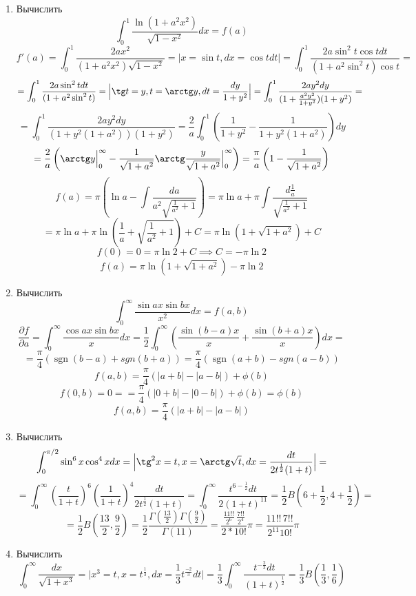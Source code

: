 \documentclass{article}
\DeclareMathOperator{\sgn}{sgn}
\begin{document}
\begin{large}
\begin{enumerate}
\item Вычислить
$$ \int_0^1 \frac{\ln(1+a^2x^2)}{\sqrt{1-x^2}} dx = f(a) $$
$$ f'(a) = \int_0^1 \frac{2ax^2}{(1+a^2x^2)\sqrt{1-x^2}} = \Big| x = \sin t, dx =\cos t dt \Big| = \int_0^1 \frac{2a\sin^2 t \cos t dt}{(1+a^2\sin^2 t)\cos t} = $$
$$ = \int_0^1 \frac{2a \sin^2 t dt}{(1+a^2\sin^2 t)} = \Big| \tg t = y, t = \arctg y, dt = \frac{dy}{1+y^2} \Big| = \int_0^1 \frac{2a y^2 dy}{(1+\frac{a^2y^2}{1+y^2})(1+y^2)} = $$
$$ = \int_0^1 \frac{2a y^2 dy}{(1+y^2(1+a^2))(1+y^2)} = \frac{2}{a} \int_0^1 \left( \frac{1}{1+y^2} - \frac{1}{1+y^2(1+a^2)} \right)dy $$
$$ = \frac{2}{a} \left( \arctg y \Big|_0^\infty - \frac{1}{\sqrt{1+a^2}} \arctg \frac{y}{\sqrt{1+a^2}} \Big|_0^\infty \right) = \frac{\pi}{a} \left(1 - \frac{1}{\sqrt{1+a^2}} \right) $$
$$ f(a) = \pi \left( \ln a - \int \frac{da}{a^2\sqrt{\frac{1}{a^2}+1}} \right) = \pi\ln a + \pi \int \frac{d\frac{1}{a}}{\sqrt{\frac{1}{a^2}+1}} $$
$$ = \pi \ln a + \pi \ln \left( \frac{1}{a} + \sqrt{\frac{1}{a^2} + 1} \right) + C = \pi\ln\left(1 + \sqrt{1+a^2} \right) + C $$
$$ f(0) = 0 = \pi\ln2 + C \implies C = -\pi\ln2 $$
$$ f(a) = \pi\ln\left(1 + \sqrt{1+a^2} \right) - \pi\ln2$$

\item Вычислить
$$ \int_0^\infty \frac{\sin ax \sin bx}{x^2}dx = f(a,b) $$
$$ \frac{\partial f}{\partial a} = \int_0^\infty \frac{\cos ax \sin bx}{x} dx = \frac{1}{2} \int_0^\infty \left( \frac{\sin (b-a)x}{x} + \frac{\sin (b+a)x}{x} \right)dx = $$
$$ = \frac{\pi}{4} (\sgn(b-a) + sgn(b+a)) = \frac{\pi}{4} (\sgn(a+b) - sgn(a-b)) $$
$$ f(a,b) = \frac{\pi}{4} (|a+b| - |a-b|) + \phi(b) $$
$$ f(0,b) = 0 == \frac{\pi}{4} (|0+b| - |0-b|) + \phi(b) = \phi(b) $$
$$ f(a,b) = \frac{\pi}{4} (|a+b| - |a-b|) $$

\item Вычислить
$$ \int_0^{\pi/2} \sin^6 x \cos^4 x dx = \Big| \tg^2 x = t, x = \arctg \sqrt{t}, dx = \frac{dt}{2t^\frac{1}{2}(1+t)} \Big| = $$
$$ = \int_0^\infty \left(\frac{t}{1+t}\right)^6 \left(\frac{1}{1+t}\right)^4 \frac{dt}{2t^\frac{1}{2}(1+t)} = \int_0^\infty \frac{t^{6-\frac{1}{2}}dt}{2(1+t)^{11}} = \frac{1}{2} B\left(6+\frac{1}{2}, 4+\frac{1}{2}\right) = $$
$$ = \frac{1}{2} B\left(\frac{13}{2}, \frac{9}{2}\right) = \frac{1}{2} \frac{\Gamma(\frac{13}{2})\Gamma(\frac{9}{2})}{\Gamma(11)} = \frac{\frac{11!!}{2^6} \, \frac{7!!}{2^4}}{2 * 10!}\pi = \frac{11!! \, 7!!}{2^{11} 10!}\pi $$

\item Вычислить
$$ \int_0^\infty \frac{dx}{\sqrt{1+x^3}} = \Big| x^3 = t, x = t^\frac{1}{3}, dx = \frac{1}{3} t^\frac{-2}{3} dt \Big| = \frac{1}{3} \int_0^\infty \frac{t^{-\frac{2}{3}}dt}{(1+t)^\frac{1}{2}} = \frac{1}{3} B\left(\frac{1}{3}, \frac{1}{6} \right)$$

\end{enumerate}
\end{large}
\end{document}

